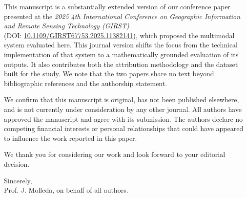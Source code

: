 \documentclass[a4paper,11pt]{letter}
\begin{document}
\vspace{1pt}
This manuscript is a substantially extended version of our conference paper presented at the \textit{2025 4th International Conference on Geographic Information and Remote Sensing Technology (GIRST)}\\
(DOI: \href{http://dx.doi.org/10.1109/GIRST67753.2025.11382141}{10.1109/GIRST67753.2025.11382141}), which proposed the multimodal system evaluated here. This journal version shifts the focus from the technical implementation of that system to a mathematically grounded evaluation of its outputs. It also contributes both the attribution methodology and the dataset built for the study. We note that the two papers share no text beyond bibliographic references and the authorship statement.


\vspace{1pt}
We confirm that this manuscript is original, has not been published elsewhere, and is not currently under consideration by any other journal. All authors have approved the manuscript and agree with its submission. The authors declare no competing financial interests or personal relationships that could have appeared to influence the work reported in this paper.

We thank you for considering our work and look forward to your editorial decision.

\bigskip
\noindent
Sincerely,\\
Prof. J. Molleda, on behalf of all authors.\\
\end{document}
